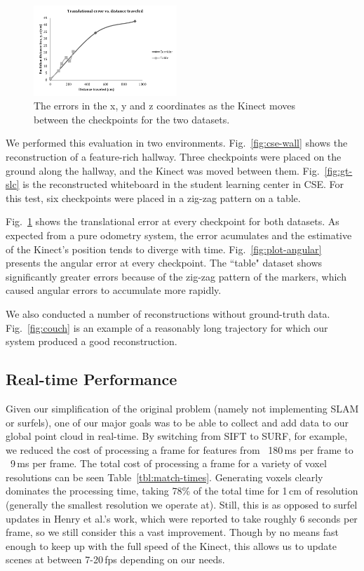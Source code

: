 \documentclass[letterpaper, 10pt, conference]{ieeeconf}
\begin{document}
\begin{figure}[t]
\centering
\includegraphics[width=0.48\textwidth]{figures/gt_translational.pdf}
\caption{The errors in the x, y and z coordinates as the Kinect moves between the checkpoints
for the two datasets.}
\label{fig:plot-trans}
\end{figure}

We performed this evaluation in two environments. Fig.~\ref{fig:cse-wall} shows the reconstruction of a
feature-rich hallway. Three checkpoints were placed on the ground along the hallway, and the Kinect was
moved between them. Fig.~\ref{fig:gt-slc} is the reconstructed whiteboard in the student learning
center in CSE. For this test, six checkpoints were placed in a zig-zag pattern on a table.

Fig.~\ref{fig:plot-trans} shows the translational error at every checkpoint for both datasets.
As expected from a pure odometry system, the error acumulates and the estimative of the Kinect's
position tends to diverge with time. Fig.~\ref{fig:plot-angular} presents the angular error at
every checkpoint. The ``table" dataset shows significantly greater errors because of the
zig-zag pattern of the markers, which caused angular errors to accumulate more rapidly.

We also conducted a number of reconstructions without ground-truth data. Fig.~\ref{fig:couch}
is an example of a reasonably long trajectory for which our system produced a good
reconstruction.

\subsection{Real-time Performance}
Given our simplification of the original problem (namely not implementing SLAM
or surfels), one of our major goals was to be able to collect and add data to
our global point cloud in real-time. By switching from SIFT to SURF, for
example, we reduced the cost of processing a frame for features from
~180\,ms per frame to ~9\,ms per frame. The total cost of processing a frame
for a variety of voxel resolutions
can be seen Table~\ref{tbl:match-times}. Generating voxels clearly dominates the
processing time, taking 78\% of the total time for 1\,cm of resolution
(generally the smallest resolution we operate at). Still, this is as opposed
to surfel updates in Henry et al.'s work, which were reported to take roughly
6 seconds per frame, so we still consider this a vast improvement. Though by
no means fast enough to keep up with the full speed of the Kinect, this allows
us to update scenes at between 7-20\,fps depending on our needs.
\end{document}
